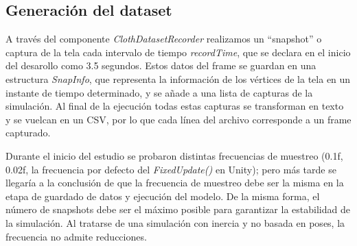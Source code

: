 \subsection{Generación del dataset}
A través del componente \textit{ClothDatasetRecorder} realizamos un ``snapshot'' o captura de la tela cada intervalo de tiempo \textit{recordTime}, que se declara en el inicio del desarollo como 3.5 segundos. Estos datos del frame se guardan en una estructura \textit{SnapInfo}, que representa la información de los vértices de la tela en un instante de tiempo determinado, y se añade a una lista de capturas de la simulación. 
Al final de la ejecución todas estas capturas se transforman en texto y se vuelcan en un CSV, por lo que cada línea del archivo corresponde a un frame capturado. \newline


\begin{algorithm}[H]
\caption{Struct SnapInfo: representación de un frame}

\end{algorithm}

Durante el inicio del estudio se probaron distintas frecuencias de muestreo (0.1f, 0.02f, la frecuencia por defecto del \textit{FixedUpdate()} en Unity); pero más tarde se llegaría a la conclusión de que la frecuencia de muestreo debe ser la misma en la etapa de guardado de datos y ejecución del modelo. De la misma forma, el número de snapshots debe ser el máximo posible para garantizar la estabilidad de la simulación. Al tratarse de una simulación con inercia y no basada en poses, la frecuencia no admite reducciones.